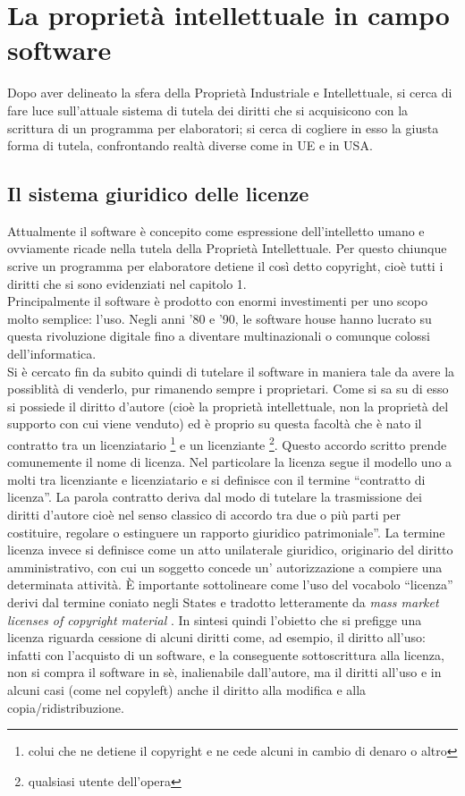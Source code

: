 \chapter{La proprietà intellettuale in campo software}
Dopo aver delineato la sfera della Proprietà Industriale e Intellettuale, si cerca di fare luce sull'attuale sistema di tutela dei diritti che si acquisicono con la scrittura di un programma per elaboratori; si cerca di cogliere in esso la giusta forma di tutela, confrontando realtà diverse come in UE e in USA. 

\section{Il sistema giuridico delle licenze}
Attualmente il software è concepito come espressione dell'intelletto umano e ovviamente ricade nella tutela della Proprietà Intellettuale. Per questo chiunque scrive un programma per elaboratore detiene il così detto copyright, cioè tutti i diritti che si sono evidenziati nel capitolo 1.\\
Principalmente il software è prodotto con enormi investimenti per uno scopo molto semplice: l'uso. Negli anni '80 e '90, le software house hanno lucrato su questa rivoluzione digitale fino a diventare multinazionali o comunque colossi dell'informatica.\\                                                      
Si è cercato fin da subito quindi di tutelare il software in maniera tale da avere la possiblità di venderlo, pur rimanendo sempre i proprietari. Come si sa su di esso si possiede il diritto d'autore (cioè la proprietà intellettuale, non la proprietà del supporto con cui viene venduto) ed è proprio su questa facoltà che è nato il contratto tra un licenziatario \footnote{colui che ne detiene il copyright e ne cede alcuni in cambio di denaro o altro} e un licenziante \footnote{qualsiasi utente dell'opera}. Questo accordo scritto prende comunemente il nome di licenza.
Nel particolare la licenza segue il modello uno a molti tra licenziante e licenziatario e si definisce con il termine ``contratto di licenza''. La parola contratto deriva dal modo di tutelare la trasmissione dei diritti d'autore cioè nel senso classico di accordo  tra due o più parti per costituire, regolare o estinguere un rapporto giuridico patrimoniale”.
La termine licenza invece si definisce come un atto unilaterale giuridico, originario del diritto amministrativo, con cui un soggetto concede un' autorizzazione a compiere una determinata attività. \`E importante sottolineare come l'uso del vocabolo ``licenza'' derivi dal termine coniato negli States e tradotto letteramente da \textit{mass market licenses of copyright material }.
In sintesi quindi l'obietto che si prefigge una licenza riguarda cessione di alcuni diritti come, ad esempio, il diritto all'uso: infatti con l'acquisto di un software, e la conseguente sottoscrittura alla licenza, non si compra il software in sè, inalienabile dall'autore, ma il diritti all'uso e in alcuni casi (come nel copyleft) anche il diritto alla modifica e alla copia/ridistribuzione.


